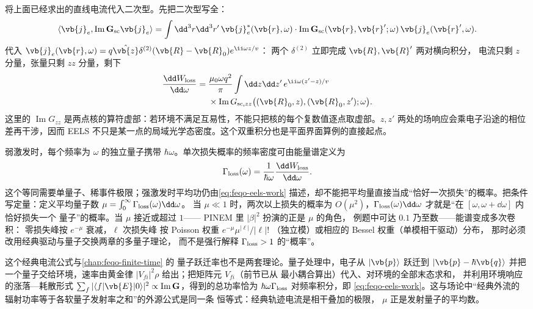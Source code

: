 将上面已经求出的直线电流代入二次型。先把二次型写全：
\[
\langle\vb{j}_e,\operatorname{Im}\mathbf G_{\rm sc}\vb{j}_e\rangle
=\int\dd^3r\dd^3r'\,
\vb{j}_e^*(\vb{r},\omega)\cdot
\operatorname{Im}\mathbf G_{\rm sc}(\vb{r},\vb{r}';\omega)\,
\vb{j}_e(\vb{r}',\omega).
\]
代入 \(\vb{j}_e(\vb{r},\omega)=q\hat{\vb{z}}\delta^{(2)}(\vb{R}-\vb{R}_0)e^{\ii\omega z/v}\)：
两个 \(\delta^{(2)}\) 立即完成 \(\vb{R},\vb{R}'\) 两对横向积分，
电流只剩 \(z\) 分量，张量只剩 \(zz\) 分量，剩下
\begin{equation}
\begin{aligned}
\frac{\dd W_{\rm loss}}{\dd\omega}
={}&\frac{\mu_0\omega q^2}{\pi}
\int\dd z\dd z'\,e^{\ii\omega(z'-z)/v}\\
&\times\operatorname{Im}G_{{\rm sc},zz}
\bigl((\vb{R}_0,z),(\vb{R}_0,z');\omega\bigr).
\end{aligned}
\label{eq:feqo-trajectory-green-kernel}
\end{equation}
这里的 \(\operatorname{Im}G_{zz}\) 是两点核的算符虚部：若环境不满足互易性，不能只把核的每个复数值逐点取虚部。\(z,z'\) 两处的场响应会乘电子沿途的相位差再干涉，因而 EELS 不只是某一点的局域光学态密度。这个双重积分也是平面界面算例的直接起点。

弱激发时，每个频率为 \(\omega\) 的独立量子携带 \(\hbar\omega\)。单次损失概率的频率密度可由能量谱定义为
\[
\Gamma_{\rm loss}(\omega)=\frac1{\hbar\omega}
\frac{\dd W_{\rm loss}}{\dd\omega}.
\]
这个等同需要单量子、稀事件极限；强激发时平均功仍由\cref{eq:feqo-eels-work} 描述，却不能把平均量直接当成“恰好一次损失”的概率。把条件写定量：定义平均量子数
\(\mu=\int_0^\infty\Gamma_{\rm loss}(\omega)\dd\omega\)。
当 \(\mu\ll1\) 时，两次以上损失的概率为
\(O(\mu^2)\)，\(\Gamma_{\rm loss}(\omega)\dd\omega\)
才就是“在 \([\omega,\omega+\dd\omega]\) 内恰好损失一个
量子”的概率。当 \(\mu\) 接近或超过 \(1\)——
PINEM 里 \(|\beta|^2\) 扮演的正是 \(\mu\) 的角色，
例题中可达 \(0.1\) 乃至数——能谱变成多次卷积：
零损失峰按 \(e^{-\mu}\) 衰减，\(\ell\) 次损失峰
按 Poisson 权重 \(e^{-\mu}\mu^{|\ell|}/|\ell|!\)
（独立模）或相应的 Bessel 权重（单模相干驱动）分布，
那时必须改用经典驱动与量子交换两章的多量子理论，
而不是强行解释 \(\Gamma_{\rm loss}>1\) 的“概率”。

这个经典电流公式与\cref{chap:feqo-finite-time} 的
量子跃迁率也不是两套理论。量子处理中，电子从
\(|\vb{p}\rangle\) 跃迁到 \(|\vb{p}-\hbar\vb{q}\rangle\)
并把一个量子交给环境，速率由黄金律
\(|V_{fi}|^2\rho\) 给出；把矩阵元 \(V_{fi}\)（前节已从
最小耦合算出）代入、对环境的全部末态求和，
并利用环境响应的涨落—耗散形式
\(\sum_f|\langle f|\vb{E}|0\rangle|^2\propto
\operatorname{Im}\mathbf G\)，得到的总功率恰为
\(\hbar\omega\Gamma_{\rm loss}\) 对频率积分，即
\cref{eq:feqo-eels-work}。这与场论中“经典外流的
辐射功率等于各软量子发射率之和”的外源公式是同一条
恒等式：经典轨迹电流是相干叠加的极限，
\(\mu\) 正是发射量子的平均数。

